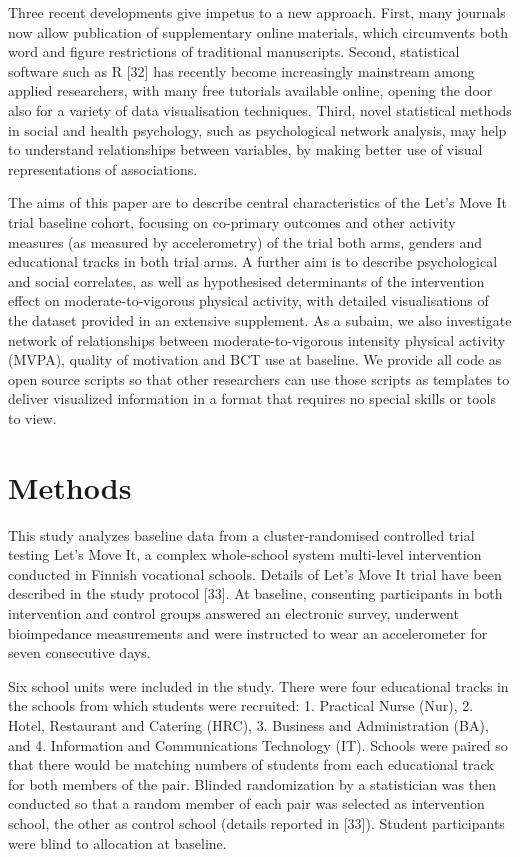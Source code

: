 \documentclass[english,man,floatsintext]{apa6}
\begin{document}
Three recent developments give impetus to a new approach. First, many journals now allow publication of supplementary online materials, which circumvents both word and figure restrictions of traditional manuscripts. Second, statistical software such as R {[}32{]} has recently become increasingly mainstream among applied researchers, with many free tutorials available online, opening the door also for a variety of data visualisation techniques. Third, novel statistical methods in social and health psychology, such as psychological network analysis, may help to understand relationships between variables, by making better use of visual representations of associations.

The aims of this paper are to describe central characteristics of the Let's Move It trial baseline cohort, focusing on co-primary outcomes and other activity measures (as measured by accelerometry) of the trial both arms, genders and educational tracks in both trial arms. A further aim is to describe psychological and social correlates, as well as hypothesised determinants of the intervention effect on moderate-to-vigorous physical activity, with detailed visualisations of the dataset provided in an extensive supplement. As a subaim, we also investigate network of relationships between moderate-to-vigorous intensity physical activity (MVPA), quality of motivation and BCT use at baseline. We provide all code as open source scripts so that other researchers can use those scripts as templates to deliver visualized information in a format that requires no special skills or tools to view.

\hypertarget{methods}{%
\section{Methods}\label{methods}}

This study analyzes baseline data from a cluster-randomised controlled trial testing Let's Move It, a complex whole-school system multi-level intervention conducted in Finnish vocational schools. Details of Let's Move It trial have been described in the study protocol {[}33{]}. At baseline, consenting participants in both intervention and control groups answered an electronic survey, underwent bioimpedance measurements and were instructed to wear an accelerometer for seven consecutive days.

Six school units were included in the study. There were four educational tracks in the schools from which students were recruited: 1. Practical Nurse (Nur), 2. Hotel, Restaurant and Catering (HRC), 3. Business and Administration (BA), and 4. Information and Communications Technology (IT). Schools were paired so that there would be matching numbers of students from each educational track for both members of the pair. Blinded randomization by a statistician was then conducted so that a random member of each pair was selected as intervention school, the other as control school (details reported in {[}33{]}). Student participants were blind to allocation at baseline.
\end{document}
